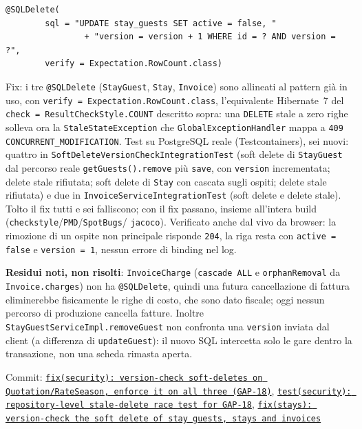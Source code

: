 ﻿\documentclass[a4paper,12pt]{report}
\newcommand{\commitref}[2]{\texttt{\small \href{https://github.com/diegoandruccioli/hotel-pms/commit/#1}{#2}}}
\begin{document}
\begin{securebox}[title={StayGuest.java --- stesso pattern di Reservation (main)}]
\begin{lstlisting}[style=java]
@SQLDelete(
        sql = "UPDATE stay_guests SET active = false, "
                + "version = version + 1 WHERE id = ? AND version = ?",
        verify = Expectation.RowCount.class)
\end{lstlisting}
\end{securebox}

Fix: i tre \texttt{@SQLDelete} (\texttt{StayGuest}, \texttt{Stay},
\texttt{Invoice}) sono allineati al pattern già in uso, con
\texttt{verify = Expectation.RowCount.class}, l'equivalente Hibernate~7 del
\texttt{check = ResultCheckStyle.COUNT} descritto sopra: una \texttt{DELETE}
stale a zero righe solleva ora la \texttt{StaleStateException} che
\texttt{GlobalExceptionHandler} mappa a \texttt{409 CONCURRENT\_MODIFICATION}.
Test su PostgreSQL reale (Testcontainers), sei nuovi: quattro in
\texttt{SoftDeleteVersionCheckIntegrationTest} (soft delete di
\texttt{StayGuest} dal percorso reale \texttt{getGuests().remove} più
\texttt{save}, con \texttt{version} incrementata; delete stale rifiutata;
soft delete di \texttt{Stay} con cascata sugli ospiti; delete stale
rifiutata) e due in \texttt{InvoiceServiceIntegrationTest} (soft delete e
delete stale). Tolto il fix tutti e sei falliscono; con il fix passano,
insieme all'intera build (\texttt{checkstyle}/\texttt{PMD}/\texttt{SpotBugs}/
\texttt{jacoco}). Verificato anche dal vivo da browser: la rimozione di un
ospite non principale risponde \texttt{204}, la riga resta con
\texttt{active = false} e \texttt{version = 1}, nessun errore di binding nel
log.

\textbf{Residui noti, non risolti}: \texttt{InvoiceCharge}
(\texttt{cascade ALL} e \texttt{orphanRemoval} da \texttt{Invoice.charges})
non ha \texttt{@SQLDelete}, quindi una futura cancellazione di fattura
eliminerebbe fisicamente le righe di costo, che sono dato fiscale; oggi
nessun percorso di produzione cancella fatture. Inoltre
\texttt{StayGuestServiceImpl.removeGuest} non confronta una \texttt{version}
inviata dal client (a differenza di \texttt{updateGuest}): il nuovo SQL
intercetta solo le gare dentro la transazione, non una scheda rimasta
aperta.

Commit: \commitref{5f5a698}{fix(security): version-check soft-deletes on Quotation/RateSeason, enforce it on all three (GAP-18)}, \commitref{83dfda4}{test(security): repository-level stale-delete race test for GAP-18}, \commitref{351ff5a5}{fix(stays): version-check the soft delete of stay guests, stays and invoices}
\end{document}
